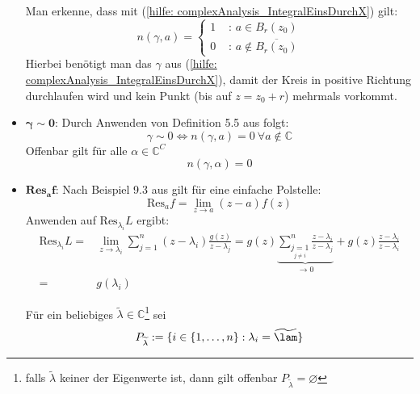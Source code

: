 \documentclass[a4paper,12pt]{report}
\newcommand{\C}{\mathbb C}
\newcommand{\1}{\mathds{1}}
\newcommand{\Res}{\text{Res}}
\theoremstyle{plain} %
\theoremstyle{definition} %
\theoremstyle{remark}
\begin{document}
\begin{itemize}
                        Man erkenne, dass mit (\ref{hilfe: complexAnalysis_IntegralEinsDurchX}) gilt:
                        \begin{equation}
                              \label{hilfe: complexAnalysis_WindungNullEins}
                              n(\gamma,a) = \begin{cases}
                                    1& \text{ : }a\in B_r(z_0)\\
                                    0& \text{ : }a\notin\overline {B_r(z_0)}
                              \end{cases}
                        \end{equation}
                        Hierbei benötigt man das $\gamma$ aus (\ref{hilfe: complexAnalysis_IntegralEinsDurchX}), damit der Kreis in positive Richtung durchlaufen wird und kein Punkt (bis auf $z=z_0+r$) mehrmals vorkommt.
                  \item $\mathbf{\gamma \sim 0}$:
                        Durch Anwenden von Definition 5.5 aus \cite[S. 67]{complexAnalysis} folgt:
                        $$\gamma \sim 0 \Leftrightarrow n(\gamma, a)=0\ \forall a\notin \C$$
                        Offenbar gilt für alle $\alpha \in \C^C$
                        $$n(\gamma, \alpha) = 0$$

                  \item $\mathbf{\Res_af}$:
                        Nach Beispiel 9.3 aus \cite[S. 142]{complexAnalysis} gilt für eine einfache Polstelle:
                        \begin{equation}
                              \label{hilfe: complexAnalysis_Residuum}
                              \Res_af = \lim_{z\to a} (z-a)f(z)
                        \end{equation}
                        Anwenden auf $\Res_{\lambda_i}L$ ergibt:
                        \begin{align*}
                              \Res_{\lambda_i}L =& \lim_{z\to \lambda_i} \sum_{j=1}^{n} (z-\lambda_i)\frac{g(z)}{z-\lambda_j} = g(z)\underbrace{\sum_{\underset{j\ne i}{j=1}}^{n} \frac{z-\lambda_i}{z-\lambda_j}}_{\to 0} + g(z)\frac{z-\lambda_i}{z-\lambda_i} \\
                              =& g(\lambda_i)
                        \end{align*}

                        Für ein beliebiges $\widetilde \lambda \in \C$\footnote{falls $\widetilde{\lambda}$ keiner der Eigenwerte ist, dann gilt offenbar $P_{\widetilde \lambda} = \varnothing$} sei
                        $$P_{\widetilde \lambda} :=\{i\in\{1,\dots,n\}: \lambda_i = \widetilde{\lam}\}$$


\end{itemize}
\end{document}

